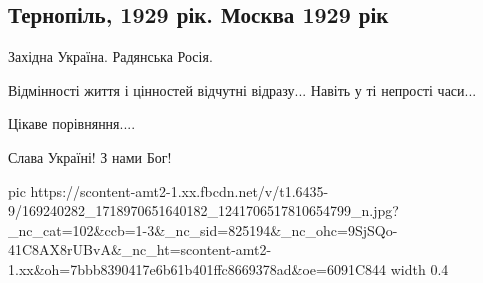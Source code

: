  
 
 
 
 

\subsection{Тернопіль, 1929 рік. Москва 1929 рік}

Західна Україна. Радянська Росія.

Відмінності життя і цінностей відчутні відразу... Навіть у ті непрості часи...

Цікаве порівняння.... 

Слава Україні! З нами Бог!

\ifcmt
  pic https://scontent-amt2-1.xx.fbcdn.net/v/t1.6435-9/169240282_1718970651640182_1241706517810654799_n.jpg?_nc_cat=102&ccb=1-3&_nc_sid=825194&_nc_ohc=9SjSQo-41C8AX8rUBvA&_nc_ht=scontent-amt2-1.xx&oh=7bbb8390417e6b61b401ffc8669378ad&oe=6091C844
  width 0.4
\fi

